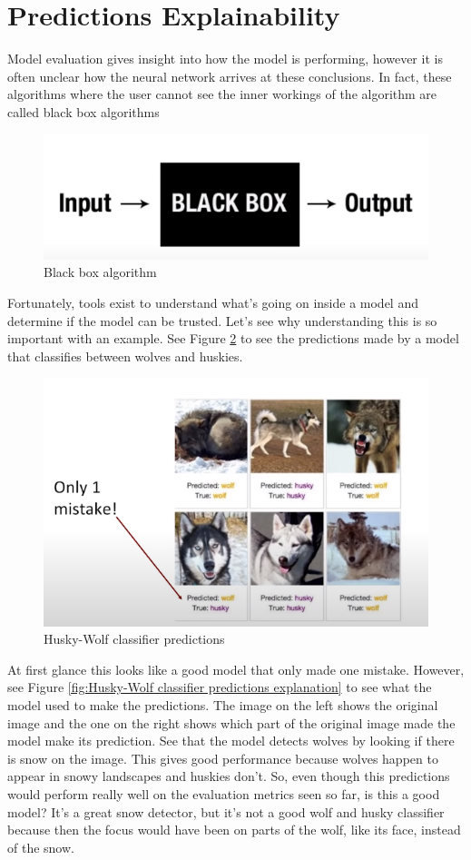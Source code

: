 \documentclass[11pt, a4paper]{article}
\begin{document}
\section{Predictions Explainability}
Model evaluation gives insight into how the model is performing, however it is often unclear how the neural network arrives at these conclusions. In fact, these algorithms where the user cannot see the inner workings of the algorithm are called black box algorithms
\begin{figure}[H]
	\centering
	\includegraphics[width=12cm]{imgs/general/Black box algorithm.PNG}
	\caption{Black box algorithm}
	 \label{fig:Black box algorithm}
\end{figure}
\noindent Fortunately, tools exist to understand what's going on inside a model and determine if the model can be trusted. Let's see why understanding this is so important with an example. See Figure \ref{fig:Husky-Wolf classifier predictions} to see the predictions made by a model that classifies between wolves and huskies. 
\begin{figure}[H]
	\centering
	\includegraphics[width=14cm]{imgs/general/Husky-Wolf classifier predictions.PNG}
	\caption{Husky-Wolf classifier predictions}
	 \label{fig:Husky-Wolf classifier predictions}
\end{figure}
\noindent At first glance this looks like a good model that only made one mistake. However, see Figure \ref{fig:Husky-Wolf classifier predictions explanation}  to see what the model used to make the predictions. The image on the left shows the original image and the one on the right shows which part of the original image made the model make its prediction. See that the model detects wolves by looking if there is snow on the image. This gives good performance because wolves happen to appear in snowy landscapes and huskies don't. So, even though this predictions would perform really well on the evaluation metrics seen so far, is this a good model? It's a great snow detector, but it's not a good wolf and husky classifier because then the focus would have been on parts of the wolf, like its face, instead of the snow.
\end{document}
